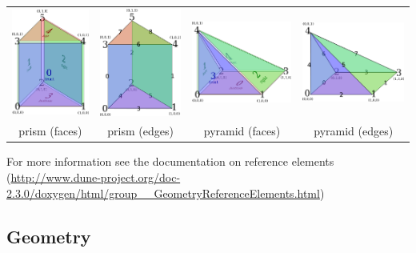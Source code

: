 \documentclass[ignorenonframetext,11pt]{beamer}
\theoremstyle{definition}
\begin{document}
\begin{frame}
\begin{onlyenv}
\begin{center}
\begin{tabular}{cccc}
      \end{tabular}
    \end{center}
    \begin{center}
      \begin{tabular}{cccc}
        \includegraphics[height=0.23\linewidth]{gg_prism} &
        \includegraphics[height=0.23\linewidth]{gg_prism_edges} &
        \includegraphics[height=0.23\linewidth]{gg_pyramid} &
        \includegraphics[height=0.23\linewidth]{gg_pyramid_edges}
        \\
        prism (faces) & prism (edges) & pyramid (faces) & pyramid (edges)\\
      \end{tabular}
    \end{center}
    For more information see the documentation on reference elements
    (\url{http://www.dune-project.org/doc-2.3.0/doxygen/html/group__GeometryReferenceElements.html})
  \end{onlyenv}
\end{frame}



\subsection{Geometry}
\end{document}
